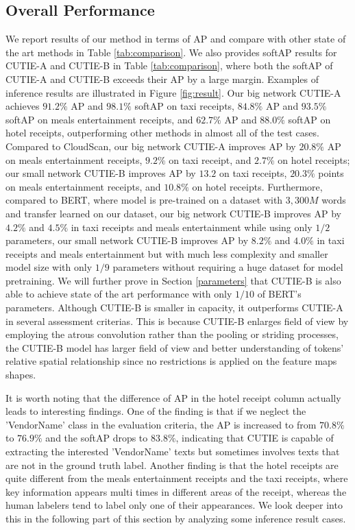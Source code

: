 \documentclass[10pt,twocolumn,letterpaper]{article}
\begin{document}
\subsection{Overall Performance}
We report results of our method in terms of AP and compare with other state of the art methods in Table \ref{tab:comparison}. We also provides softAP results for CUTIE-A and CUTIE-B in Table \ref{tab:comparison}, where both the softAP of CUTIE-A and CUTIE-B exceeds their AP by a large margin.  Examples of inference results are illustrated in Figure \ref{fig:result}. Our big network CUTIE-A achieves $91.2\%$ AP and $98.1\%$ softAP on taxi receipts, $84.8\%$ AP and $93.5\%$ softAP on meals entertainment receipts, and $62.7\%$ AP and $88.0\%$ softAP on hotel receipts, outperforming other methods in almost all of the test cases. Compared to CloudScan, our big network CUTIE-A improves AP by $20.8\%$ AP on meals entertainment receipts, $9.2\%$ on taxi receipt, and $2.7\%$ on hotel receipts; our small network CUTIE-B improves AP by $13.2$ on taxi receipts, $20.3\%$ points on meals entertainment receipts, and $10.8\%$ on hotel receipts. Furthermore, compared to BERT, where model is pre-trained on a dataset with $3,300M$ words and transfer learned on our dataset, our big network CUTIE-B improves AP by $4.2\%$ and $4.5\%$ in taxi receipts and meals entertainment while using only $1/2$ parameters, our small network CUTIE-B improves AP by $8.2\%$ and $4.0\%$ in taxi receipts and meals entertainment but with much less complexity and smaller model size with only $1/9$ parameters without requiring a huge dataset for model pretraining. We will further prove in Section \ref{parameters} that CUTIE-B is also able to achieve state of the art performance with only $1/10$ of BERT's parameters. Although CUTIE-B is smaller in capacity, it outperforms CUTIE-A in several assessment criterias. This is because CUTIE-B enlarges field of view by employing the atrous convolution rather than the pooling or striding processes, the CUTIE-B model has larger field of view and better understanding of tokens' relative spatial relationship since no restrictions is applied on the feature maps shapes. 

It is worth noting that the difference of AP in the hotel receipt column actually leads to interesting findings. One of the finding is that if we neglect the 'VendorName' class in the evaluation criteria, the AP is increased to from $70.8\%$ to $76.9\%$ and the softAP drops to $83.8\%$, indicating that CUTIE is capable of extracting the interested 'VendorName' texts but sometimes involves texts that are not in the ground truth label. Another finding is that the hotel receipts are quite different from the meals entertainment receipts and the taxi receipts, where key information appears multi times in different areas of the receipt, whereas the human labelers tend to label only one of their appearances. We look deeper into this in the following part of this section by analyzing some inference result cases.
\end{document}
